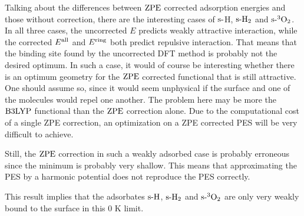 \documentclass[8.5pt,twoside,twocolumn]{article}
\newcommand\zpe{\enmat{\te{ZPE}}}
\newcommand\ering{\enmat{E^{\te{ring}}}}
\newcommand\eall{\enmat{E^{\te{all}}}}
\newcommand\sur{\enmat{\te{s-}}}
\newcommand\tripot{\enmat{{^3\ot}}}
\theoremstyle{standard}
\begin{document}
Talking about the differences between $\zpe$ corrected adsorption energies
and those without correction, there are the interesting cases of 
$\sur$H, $\sur\htw$ and $\sur\tripot$. In all three cases, the uncorrected
$E$ predicts weakly attractive interaction, while the corrected $\eall$
and $\ering$ both predict repulsive interaction. That means that
the binding site found by the uncorrected DFT method is probably not the
desired optimum.
In such a case, it would of
course be interesting whether there is an optimum geometry for the $\zpe$
corrected functional that is still attractive. One should assume so,
since it would seem unphysical if the surface and one of the
molecules would repel one another. The problem here may be more the
$\text{B3LYP}$ functional than the $\zpe$ correction alone. Due to the computational
cost of a single ZPE correction, an optimization on a ZPE corrected
PES will be very difficult to achieve.

Still, the $\zpe$ correction in such a weakly adsorbed case is probably
erroneous since the minimum is probably very shallow. This means
that approximating the PES by a harmonic potential does not reproduce the PES
correctly.

This result implies that the adsorbates $\sur{\te H}$, $\sur{\htw}$ and
$\sur{\tripot}$ are only very weakly bound to the surface in this 0 K limit.

\end{document}
